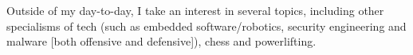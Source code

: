

\begin{cvparagraph}

Outside of my day-to-day, I take an interest in several topics, including other specialisms of tech (such as embedded software/robotics, security engineering and malware
[both offensive and defensive]), chess and powerlifting.

\end{cvparagraph}
